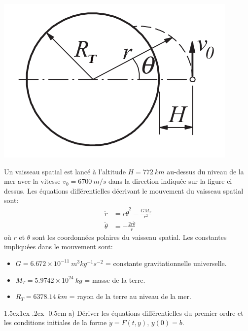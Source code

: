 \documentclass[%
oneside,                 %
final,                   %
10pt,french]{article}
\makeatletter
\newenvironment{doconceexercise}{}{}
\newcounter{doconceexercisecounter}
\newcommand\subex{\@startsection{paragraph}{4}{\z@}%
                  {1.5ex\@plus1ex \@minus.2ex}%
                  {-0.5em}%
                  {\normalfont\normalsize\bfseries}}
\makeatother
\begin{document}
\begin{doconceexercise}





\vspace{6mm}

\centerline{\includegraphics[width=0.4\linewidth]{imgs/spacecraft.png}}

\vspace{6mm}



Un vaisseau spatial est lancé à l'altitude $H = 772 \ km$ au-dessus du niveau de la mer avec la vitesse $v_0 = 6700 \ m/s$ dans la direction indiquée sur la figure ci-dessus. Les équations différentielles décrivant le mouvement du vaisseau spatial sont:
\begin{align*}
\ddot{r} &= r \dot{\theta}^2 - \frac{G M_T}{r^2} \\
\ddot{\theta} &= - \frac{2 \dot{r} \dot{\theta}}{r}
\end{align*}
où $r$ et $\theta$ sont les coordonnées polaires du vaisseau spatial. Les constantes impliquées dans le mouvement sont:
\begin{itemize}
\item $G = 6.672 \times 10^{−11} \ m^3 kg^{−1} s^{−2}$ = constante gravitationnelle universelle.

\item $M_T = 5.9742 \times 10^{24} \ kg$ = masse de la terre.

\item $R_T = 6378.14 \ km$ = rayon de la terre au niveau de la mer.
\end{itemize}

\noindent
\subex{a)}
Dériver les équations différentielles du premier ordre et les conditions initiales de la forme $\dot{y} = F (t, y)$, $y(0) = b$.



\end{doconceexercise}
\end{document}
